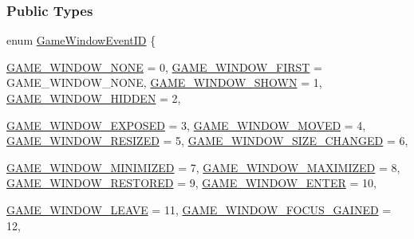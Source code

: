 \subsubsection*{Public Types}
\begin{DoxyCompactItemize}
\item 
enum \hyperlink{classphys_1_1EventGameWindow_a45225255070513d3cff88cdfea25cc09}{GameWindowEventID} \{ \par
\hyperlink{classphys_1_1EventGameWindow_a45225255070513d3cff88cdfea25cc09ae2a7610e7a32d53ee92bf5fe2764935c}{GAME\_\-WINDOW\_\-NONE} = 0, 
\hyperlink{classphys_1_1EventGameWindow_a45225255070513d3cff88cdfea25cc09a9109b7fb1835941a0519f37a5dc2f938}{GAME\_\-WINDOW\_\-FIRST} =  GAME\_\-WINDOW\_\-NONE, 
\hyperlink{classphys_1_1EventGameWindow_a45225255070513d3cff88cdfea25cc09a2f86504eb791b0181b499bdcb2250d1d}{GAME\_\-WINDOW\_\-SHOWN} =  1, 
\hyperlink{classphys_1_1EventGameWindow_a45225255070513d3cff88cdfea25cc09aa567edb744271aacd02f22f596c46d8d}{GAME\_\-WINDOW\_\-HIDDEN} =  2, 
\par
\hyperlink{classphys_1_1EventGameWindow_a45225255070513d3cff88cdfea25cc09ada7c1c23c6da30aee3debba363379be4}{GAME\_\-WINDOW\_\-EXPOSED} =  3, 
\hyperlink{classphys_1_1EventGameWindow_a45225255070513d3cff88cdfea25cc09a20f2c7da3eb4d22b4c2f92788daabfef}{GAME\_\-WINDOW\_\-MOVED} =  4, 
\hyperlink{classphys_1_1EventGameWindow_a45225255070513d3cff88cdfea25cc09a03d9f1f081bbca89a4de1f13f1c150e9}{GAME\_\-WINDOW\_\-RESIZED} =  5, 
\hyperlink{classphys_1_1EventGameWindow_a45225255070513d3cff88cdfea25cc09ae85ae9b84cd785e0eafdb3e4ade17b7e}{GAME\_\-WINDOW\_\-SIZE\_\-CHANGED} =  6, 
\par
\hyperlink{classphys_1_1EventGameWindow_a45225255070513d3cff88cdfea25cc09a96e49680f8a4dc93d34056d03882a691}{GAME\_\-WINDOW\_\-MINIMIZED} =  7, 
\hyperlink{classphys_1_1EventGameWindow_a45225255070513d3cff88cdfea25cc09a8d43573619988df44708ed9f6cbfe737}{GAME\_\-WINDOW\_\-MAXIMIZED} =  8, 
\hyperlink{classphys_1_1EventGameWindow_a45225255070513d3cff88cdfea25cc09a948c8fd4eb2791edbc1d1db03a7d831d}{GAME\_\-WINDOW\_\-RESTORED} =  9, 
\hyperlink{classphys_1_1EventGameWindow_a45225255070513d3cff88cdfea25cc09a277538cd68003ba6910fa502223b1211}{GAME\_\-WINDOW\_\-ENTER} =  10, 
\par
\hyperlink{classphys_1_1EventGameWindow_a45225255070513d3cff88cdfea25cc09ac8fa0e63e6a667cec270ef1f6d22637f}{GAME\_\-WINDOW\_\-LEAVE} =  11, 
\hyperlink{classphys_1_1EventGameWindow_a45225255070513d3cff88cdfea25cc09af1af852f11ba0c2f11b7a2b8131e3bb3}{GAME\_\-WINDOW\_\-FOCUS\_\-GAINED} =  12, 

\end{DoxyCompactItemize}
